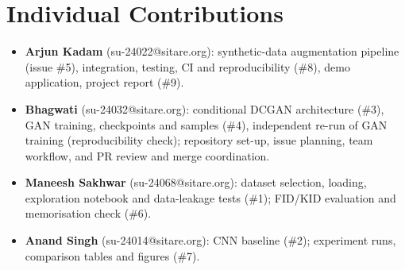 \section*{Individual Contributions}
\begin{itemize}
  \item \textbf{Arjun Kadam} (su-24022@sitare.org): synthetic-data augmentation pipeline (issue \#5), integration, testing,
        CI and reproducibility (\#8), demo application, project report (\#9).
  \item \textbf{Bhagwati} (su-24032@sitare.org): conditional DCGAN architecture (\#3), GAN training, checkpoints and samples (\#4), independent re-run of GAN training (reproducibility check);
        repository set-up, issue planning, team workflow, and PR review and merge coordination.
  \item \textbf{Maneesh Sakhwar} (su-24068@sitare.org): dataset selection, loading, exploration notebook and data-leakage tests (\#1); FID/KID evaluation
        and memorisation check (\#6).
  \item \textbf{Anand Singh} (su-24014@sitare.org): CNN baseline (\#2); experiment runs, comparison tables and figures (\#7).
\end{itemize}

